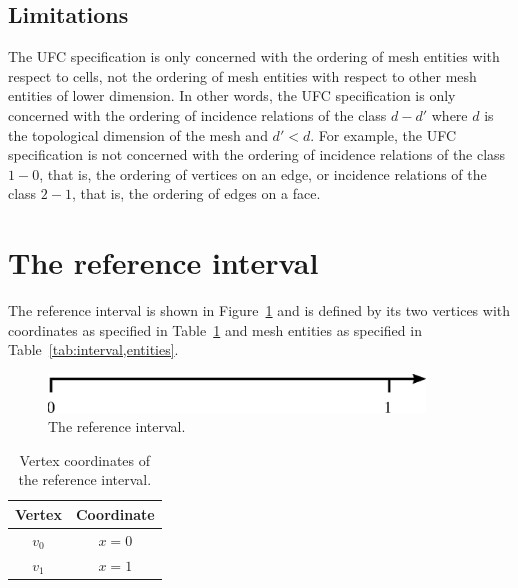\subsection{Limitations}

The UFC specification is only concerned with the ordering of mesh
entities with respect to cells, not the ordering of mesh entities
with respect to other mesh entities of lower dimension. In other
words, the UFC specification is only concerned with the ordering of
incidence relations of the class $d - d'$ where $d$ is the
topological dimension of the mesh and $d' < d$. For example, the UFC
specification is not concerned with the ordering of incidence
relations of the class $1 - 0$, that is, the ordering of vertices on
an edge, or incidence relations of the class $2 - 1$, that is, the
ordering of edges on a face.

\newpage
\section{The reference interval}

The reference interval is shown in Figure~\ref{fig:interval} and is
defined by its two vertices with coordinates as specified in
Table~\ref{tab:interval,vertices} and mesh entities as specified in
Table~\ref{tab:interval,entities}.

\begin{figure}[H]
  \begin{center}
    \includegraphics[width=10cm]{eps/interval.eps}
    \caption{The reference interval.}
    \label{fig:interval}
  \end{center}
\end{figure}

\begin{table}[H]
\linespread{1.2}\selectfont
  \begin{center}
    \begin{tabular}{|c|c|}
      \hline
      Vertex & Coordinate \\
      \hline
      \hline
      $v_0$ & $x = 0$ \\
      \hline
      $v_1$ & $x = 1$ \\
      \hline
    \end{tabular}
    \caption{Vertex coordinates of the reference interval.}
    \label{tab:interval,vertices}
  \end{center}
\end{table}


